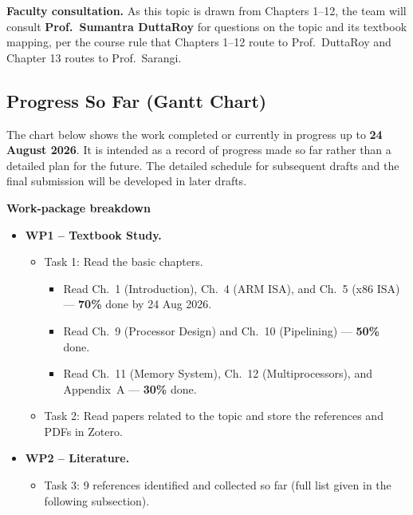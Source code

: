 \documentclass[12pt,a4paper]{article}
\begin{document}
\medskip
\noindent\textbf{Faculty consultation.} As this topic is drawn from
Chapters 1--12, the team will consult \textbf{Prof.\ Sumantra
DuttaRoy} for questions on the topic and its textbook mapping, per the
course rule that Chapters 1--12 route to Prof.\ DuttaRoy and Chapter 13
routes to Prof.\ Sarangi.

\subsection{Progress So Far (Gantt Chart)}
The chart below shows the work completed or currently in progress up to
\textbf{24 August 2026}. It is intended as a record of progress made so
far rather than a detailed plan for the future. The detailed schedule
for subsequent drafts and the final submission will be developed in
later drafts.

\noindent\textbf{Work-package breakdown}
\begin{itemize}[leftmargin=*, itemsep=2pt]
\item \textbf{WP1 -- Textbook Study.}
  \begin{itemize}[itemsep=1pt]
    \item Task 1: Read the basic chapters.
      \begin{itemize}[itemsep=1pt]
        \item Read Ch.~1 (Introduction), Ch.~4 (ARM ISA), and
        Ch.~5 (x86 ISA) --- \textbf{70\%} done by 24 Aug 2026.
        \item Read Ch.~9 (Processor Design) and Ch.~10 (Pipelining)
        --- \textbf{50\%} done.
        \item Read Ch.~11 (Memory System), Ch.~12 (Multiprocessors),
        and Appendix~A --- \textbf{30\%} done.
      \end{itemize}
    \item Task 2: Read papers related to the topic and store the
    references and PDFs in Zotero.
  \end{itemize}
\item \textbf{WP2 -- Literature.}
  \begin{itemize}[itemsep=1pt]
    \item Task 3: 9 references identified and collected so far
    (full list given in the following subsection).
  \end{itemize}
\end{itemize}
\end{document}
